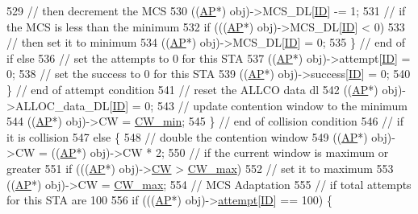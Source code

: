 \begin{DoxyCode}
{529                     \textcolor{comment}{// then decrement the MCS}
530                     ((\hyperlink{classAP}{AP}*) obj)->MCS\_DL[\hyperlink{classSTA_a9376abb50969b5b16aeb5fb0e449e6f7}{ID}] -= 1;
531                     \textcolor{comment}{// if the MCS is less than the minimum}
532                     \textcolor{keywordflow}{if} (((\hyperlink{classAP}{AP}*) obj)->MCS\_DL[\hyperlink{classSTA_a9376abb50969b5b16aeb5fb0e449e6f7}{ID}] < 0)
533                         \textcolor{comment}{// then set it to minimum}
534                         ((\hyperlink{classAP}{AP}*) obj)->MCS\_DL[\hyperlink{classSTA_a9376abb50969b5b16aeb5fb0e449e6f7}{ID}] = 0;
535                 \} \textcolor{comment}{// end of if else}
536                   \textcolor{comment}{// set the attempts to 0 for this STA     }
537                 ((\hyperlink{classAP}{AP}*) obj)->attempt[\hyperlink{classSTA_a9376abb50969b5b16aeb5fb0e449e6f7}{ID}] = 0;
538                 \textcolor{comment}{// set the success to 0 for this STA}
539                 ((\hyperlink{classAP}{AP}*) obj)->success[\hyperlink{classSTA_a9376abb50969b5b16aeb5fb0e449e6f7}{ID}] = 0;
540             \} \textcolor{comment}{// end of attempt condition}
541               \textcolor{comment}{// reset the ALLCO data dl}
542             ((\hyperlink{classAP}{AP}*) obj)->ALLOC\_data\_DL[\hyperlink{classSTA_a9376abb50969b5b16aeb5fb0e449e6f7}{ID}] = 0;
543             \textcolor{comment}{// update contention window to the minimum}
544             ((\hyperlink{classAP}{AP}*) obj)->CW = \hyperlink{classSTA_ab466517298fbdaa0efd8532646930dfd}{CW\_min};
545         \} \textcolor{comment}{// end of collision condition}
546           \textcolor{comment}{// if it is collision}
547         \textcolor{keywordflow}{else} \{
548             \textcolor{comment}{// double the contention window}
549             ((\hyperlink{classAP}{AP}*) obj)->CW = ((\hyperlink{classAP}{AP}*) obj)->CW * 2;
550             \textcolor{comment}{// if the current window is maximum or greater}
551             \textcolor{keywordflow}{if} (((\hyperlink{classAP}{AP}*) obj)->\hyperlink{classSTA_add0683c8927abd74b422d88844a00602}{CW} > \hyperlink{classSTA_ac341bce4f378ac00fd29b69a44b75dee}{CW\_max})
552                 \textcolor{comment}{// set it to maximum}
553                 ((\hyperlink{classAP}{AP}*) obj)->CW = \hyperlink{classSTA_ac341bce4f378ac00fd29b69a44b75dee}{CW\_max};
554             \textcolor{comment}{// MCS Adaptation}
555             \textcolor{comment}{// if total attempts for this STA are 100   }
556             \textcolor{keywordflow}{if} (((\hyperlink{classAP}{AP}*) obj)->\hyperlink{classSTA_a4cfeac60ce7a13a4bbae68b756655dc9}{attempt}[\hyperlink{classSTA_a9376abb50969b5b16aeb5fb0e449e6f7}{ID}] == 100) \{
}
\end{DoxyCode}
